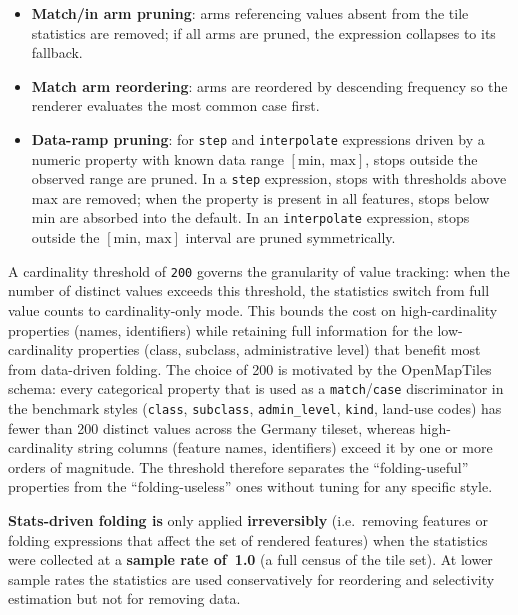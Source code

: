 \begin{itemize}
    Strict-inequality folds on floating-point columns are applied at the reported min/max values exactly; stats collection uses the observed extrema rather than synthetic bounds, so the boundary comparison coincides with a value that actually occurs, which is the only case where the fold is unconditionally sound.
    \item \textbf{Match/in arm pruning}: arms referencing values absent from the tile statistics are removed; if all arms are pruned, the expression collapses to its fallback.
    \item \textbf{Match arm reordering}: arms are reordered by descending frequency so the renderer evaluates the most common case first.
    \item \textbf{Data-ramp pruning}: for \texttt{step} and \texttt{interpolate} expressions driven by a numeric property with known data range $[\mathrm{min},\, \mathrm{max}]$, stops outside the observed range are pruned.
    In a \texttt{step} expression, stops with thresholds above $\mathrm{max}$ are removed; when the property is present in all features, stops below $\mathrm{min}$ are absorbed into the default.
    In an \texttt{interpolate} expression, stops outside the $[\mathrm{min},\, \mathrm{max}]$ interval are pruned symmetrically.
\end{itemize}

\noindent A cardinality threshold of \texttt{200} governs the granularity of value tracking: when the number of distinct values exceeds this threshold, the statistics switch from full value counts to cardinality-only mode.
This bounds the cost on high-cardinality properties (names, identifiers) while retaining full information for the low-cardinality properties (class, subclass, administrative level) that benefit most from data-driven folding.
The choice of 200 is motivated by the OpenMapTiles schema: every categorical property that is used as a \texttt{match}/\texttt{case} discriminator in the benchmark styles (\texttt{class}, \texttt{subclass}, \texttt{admin\_level}, \texttt{kind}, land-use codes) has fewer than 200 distinct values across the Germany tileset, whereas high-cardinality string columns (feature names, identifiers) exceed it by one or more orders of magnitude.
The threshold therefore separates the \enquote{folding-useful} properties from the \enquote{folding-useless} ones without tuning for any specific style.

\textbf{Stats-driven folding is} only applied \textbf{irreversibly} (i.e.\ removing features or folding expressions that affect the set of rendered features) when the statistics were collected at a \textbf{sample rate of~1.0} (a full census of the tile set).
At lower sample rates the statistics are used conservatively for reordering and selectivity estimation but not for removing data.

